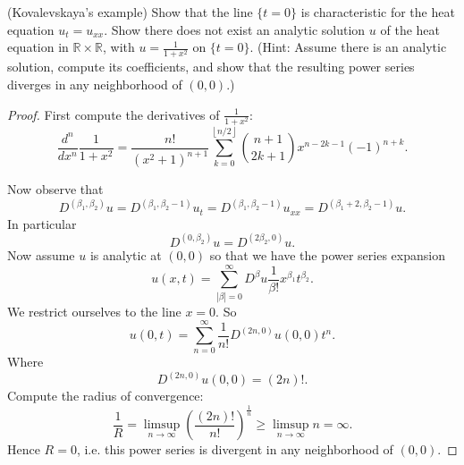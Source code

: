 \begin{problem}
	(Kovalevskaya's example) Show that the line $\{t=0\}$ is characteristic for the heat equation $u_t=u_{x x}$. Show there does not exist an analytic solution $u$ of the heat equation in $\mathbb{R} \times \mathbb{R}$, with $u=\frac{1}{1+x^2}$ on $\{t=0\}$. (Hint: Assume there is an analytic solution, compute its coefficients, and show that the resulting power series diverges in any neighborhood of $(0,0)$.)
\end{problem}
\begin{proof}
	First compute the derivatives of $\frac{1}{1+x^2}$:
	\[
		\frac{d ^n}{d x^n} \frac{1}{1+x^2}
		= \frac{n!}{(x^2 + 1)^{n+1}} 
		\sum_{k=0}^{\left\lfloor n / 2 \right\rfloor}  \binom{n+1}{2k+1} x^{n - 2 k - 1}(-1)^{n+k}
	.\] 

	Now observe that
	\[
		D^{(\beta_1, \beta_2)} u = D^{(\beta_1, \beta_2 - 1)} u_t =D^{(\beta_1, \beta_2 - 1)} u_{x x} = D^{(\beta_1+2, \beta_2-1)} u
	.\] 
	In particular
	\[
		D^{(0,\beta_2)} u = D^{(2 \beta_2, 0)} u
	.\] 
	Now assume $u$ is analytic at $(0,0)$ so that we have the power series expansion
	\[
		u(x, t) = \sum_{|\beta|=0}^{\infty} D^{\beta} u \frac{1}{\beta!}x^{\beta_1} t^{\beta_2}
	.\] 
	We restrict ourselves to the line $x = 0$. So
	\[
		u(0,t) = \sum_{n = 0}^{\infty } \frac{1}{n!} D^{(2 n, 0)}u(0,0)t^n
	.\] 
	Where
	\[
		D^{(2n, 0)}u(0,0) = (2n)!
	.\] 
	Compute the radius of convergence:
	\[
		\frac{1}{R} = \limsup_{n \to \infty } \left( \frac{(2n)!}{n!} \right) ^{\frac{1}{n}} \ge \limsup_{n \to \infty } n = \infty 
	.\] 
	Hence $R = 0$, i.e. this power series is divergent in any neighborhood of $(0,0)$.


\end{proof}



